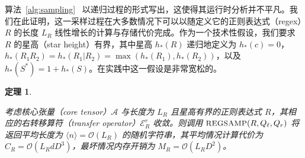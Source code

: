 \documentclass[twoside]{article}
\newtheorem{theorem}{定理}
\newcommand{\Sample}{\textsc{\small REGSAMP}}
\newcommand{\bigO}{\mc{O}}
\newcommand{\ER}{\mc{E}^{\scriptstyle r}}
\newcommand{\QL}{Q_{\ell}}
\newcommand{\QR}{Q_{r}}
\newcommand{\mc}[1]{\mathcal{#1}}
\begin{document}
算法~\ref{alg:sampling} 
\ 以递归过程的形式写出，这使得其运行时分析并不平凡。我们在此证明，这一采样过程在大多数情况下可以以随定义它的正则表达式（regex）$R$ 的长度 $L_R$ 线性增长的计算与存储代价完成。作为一个技术性假设，我们要求 $R$ 的星高（star height）有界，其中星高 $h_*(R)$ 递归地定义为 $h_*(c) = 0$，$h_*(R_1 R_2) = h_*(R_1 | R_2) = \max(h_*(R_1), h_*(R_2))$，以及 $h_*(S^*) = 1 + h_*(S)$。在实践中这一假设是非常宽松的。

\begin{theorem}
\label{thm:runtime}

考虑核心张量（core tensor）$\mc{A}$ 与长度为 $L_R$ 且星高有界的正则表达式 $R$，其相应的右转移算符（transfer operator）$\ER_R$ 收敛。则调用 $\Sample(R, \QL, \QR)$ 将返回平均长度为 $\langle n \rangle = \bigO(L_R)$ 的随机字符串，其平均情况计算代价为 $C_R = \bigO(L_R d D^3)$，最坏情况内存开销为 $M_R = \bigO(L_R D^2)$。

\end{theorem}
\end{document}
